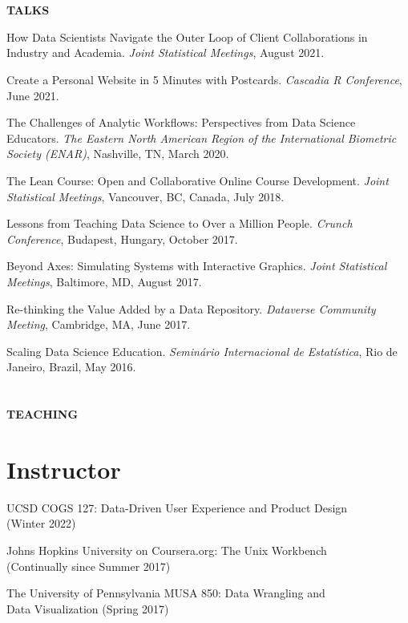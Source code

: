 \vspace{0.1in}

\section{} \textbf{TALKS} \vspace{0.05in}

\begin{innerlist}
\item How Data Scientists Navigate the Outer Loop of Client Collaborations in Industry and Academia. \textit{Joint Statistical Meetings}, August 2021.
\item Create a Personal Website in 5 Minutes with Postcards. \textit{Cascadia R Conference}, June 2021.
\item The Challenges of Analytic Workflows: Perspectives from Data Science Educators. \textit{The Eastern North American Region of the International Biometric Society (ENAR)}, Nashville, TN, March 2020.
\item The Lean Course: Open and Collaborative Online Course Development. \textit{Joint Statistical Meetings}, Vancouver, BC, Canada, July 2018.
\item Lessons from Teaching Data Science to Over a Million People. \textit{Crunch Conference}, Budapest, Hungary, October 2017.
\item Beyond Axes: Simulating Systems with Interactive Graphics. \textit{Joint Statistical Meetings}, Baltimore, MD, August 2017.
\item Re-thinking the Value Added by a Data Repository. \textit{Dataverse Community Meeting}, Cambridge, MA, June 2017.
\item Scaling Data Science Education. \textit{Seminário Internacional de Estatística}, Rio de Janeiro, Brazil, May 2016.
\end{innerlist}


\section{} \textbf{TEACHING} \vspace{-0.05in}

\section{Instructor}

\begin{innerlist}
\item UCSD COGS 127: Data-Driven User Experience and Product Design  \\ (Winter 2022)
\item Johns Hopkins University on Coursera.org: The Unix Workbench \\ (Continually since Summer 2017)
\item The University of Pennsylvania MUSA 850: Data Wrangling and \\ Data Visualization (Spring 2017)
\end{innerlist}

